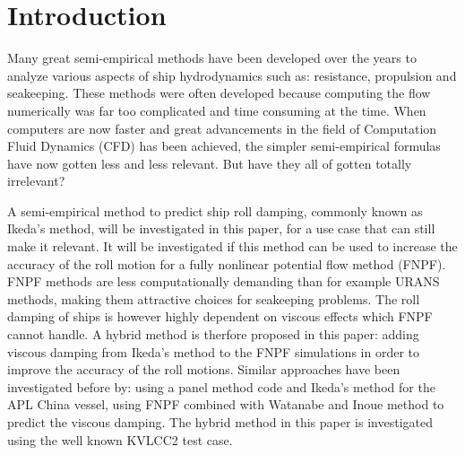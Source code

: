 \section{Introduction}\label{introduction}

Many great semi-empirical methods have been developed over the years to
analyze various aspects of ship hydrodynamics such as: resistance,
propulsion and seakeeping. These methods were often developed because
computing the flow numerically was far too complicated and time
consuming at the time. When computers are now faster and great
advancements in the field of Computation Fluid Dynamics (CFD) has been
achieved, the simpler semi-empirical formulas have now gotten less and
less relevant. But have they all of gotten totally irrelevant?

A semi-empirical method to predict ship roll damping, commonly known as
Ikeda's method, will be investigated in this paper, for a use case that
can still make it relevant. It will be investigated if this method can
be used to increase the accuracy of the roll motion for a fully
nonlinear potential flow method (FNPF). FNPF methods are less
computationally demanding than for example URANS methods, making them
attractive choices for seakeeping problems. The roll damping of ships is
however highly dependent on viscous effects which FNPF cannot handle. A
hybrid method is therfore proposed in this paper: adding viscous damping
from Ikeda's method to the FNPF simulations in order to improve the
accuracy of the roll motions. Similar approaches have been investigated
before by: \cite{7505983/UGK6YEVD} using a panel method code and Ikeda's
method for the APL China vessel, \cite{7505983/24TNAV5Z} using FNPF
combined with Watanabe and Inoue method to predict the viscous damping.
The hybrid method in this paper is investigated using the well known
KVLCC2 test case.

    